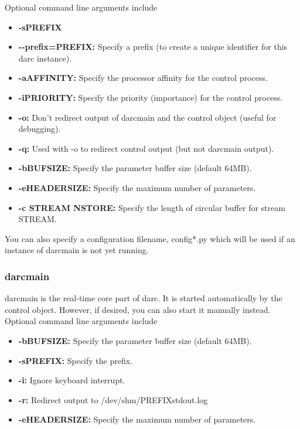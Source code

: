 \documentclass[a4,10pt]{article}
\begin{document}
Optional command line arguments include
\begin{center}
\begin{itemize}
\item {\bf -sPREFIX}
\item {\bf -{-}prefix=PREFIX:} Specify a prefix (to create a unique
  identifier for this darc instance).
\item {\bf -aAFFINITY:} Specify the processor affinity for the control
  process.
\item {\bf -iPRIORITY:} Specify the priority (importance) for the control
  process.
\item {\bf -o:} Don't redirect output of darcmain and the control object
  (useful for debugging).
\item {\bf -q:} Used with -o to redirect control output (but not darcmain
  output).
\item {\bf -bBUFSIZE:} Specify the parameter buffer size (default 64MB).
\item {\bf -eHEADERSIZE:} Specify the maximum number of parameters.
\item {\bf -c STREAM NSTORE:} Specify the length of circular buffer for
stream STREAM.
\end{itemize}
\end{center}
You can also specify a configuration filename, config*.py which will
be used if an instance of darcmain is not yet running.

\subsubsection{darcmain}
darcmain is the real-time core part of darc.  It is started
automatically by the control object.  However, if desired, you can
also start it manually instead.  Optional command line arguments include
\begin{itemize}
\item {\bf -bBUFSIZE:} Specify the parameter buffer size (default 64MB).
\item {\bf -sPREFIX:} Specify the prefix.
\item {\bf -i:} Ignore keyboard interrupt.
\item {\bf -r:} Redirect output to /dev/shm/PREFIXstdout.log
\item {\bf -eHEADERSIZE:} Specify the maximum number of parameters.
\end{itemize}
\end{document}
